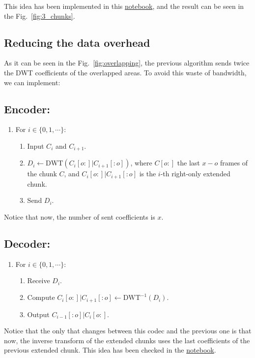 This idea has been implemented in this
\href{https://github.com/Tecnologias-multimedia/intercom/blob/master/docs/overlapped_DWT_I.ipynb}{notebook},
and the result can be seen in the Fig.~\ref{fig:3_chunks}.

\subsection{Reducing the data overhead}

As it can be seen in the Fig.~\ref{fig:overlapping}, the previous
algorithm sends twice the DWT coefficients of the overlapped areas. To
avoid this waste of bandwidth, we can implement:

\subsection*{Encoder:}
\begin{enumerate}
\item For $i\in\{0,1,\cdots\}$:
  \begin{enumerate}
  \item Input $C_i$ and $C_{i+1}$.
  \item $D_i \leftarrow \text{DWT}(C_i[o:]|C_{i+1}[:o])$, where
    $C[o:]$ the last $x-o$ frames of the chunk $C$, and
    $C_i[o:]|C_{i+1}[:o]$ is the $i$-th right-only extended chunk.
    \item Send $D_i$.
  \end{enumerate}
\end{enumerate}

Notice that now, the number of sent coefficients is $x$.

\subsection*{Decoder:}
\begin{enumerate}
\item For $i\in\{0,1,\cdots\}$:
  \begin{enumerate}
  \item Receive $D_i$.
  \item Compute $C_i[o:]|C_{i+1}[:o]\leftarrow\text{DWT}^{-1}(D_i)$.
  \item Output $C_{i-1}[:o]|C_i[o:]$.
  \end{enumerate}
\end{enumerate}

Notice that the only that changes between this codec and the previous
one is that now, the inverse transform of the extended chunks uses the
last coefficients of the previous extended chunk. This idea has been
checked in the
\href{https://github.com/Tecnologias-multimedia/intercom/blob/master/docs/overlapped_DWT_II.ipynb}{notebook}.

